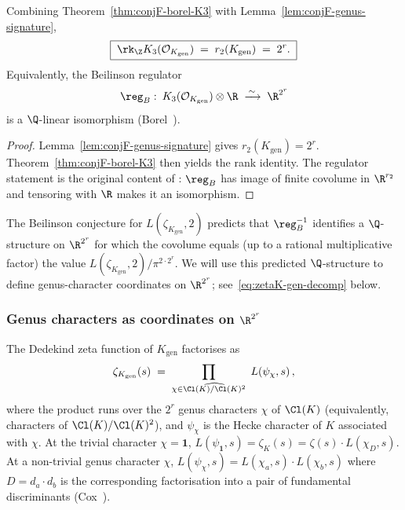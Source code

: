 \begin{corollary}\label{cor:conjF-borel-gen}
Combining Theorem~\ref{thm:conjF-borel-K3} with
Lemma~\ref{lem:conjF-genus-signature},
\[
   \boxed{\;\rk_\Z K_3(\mathcal{O}_{K_{\mathrm{gen}}}) \;=\;
   r_2(K_{\mathrm{gen}}) \;=\; 2^r.\;}
\]
Equivalently, the Beilinson regulator
\[
   \reg_B \,\colon\, K_3(\mathcal{O}_{K_{\mathrm{gen}}}) \otimes \R
   \;\xrightarrow{\,\sim\,}\; \R^{2^r}
\]
is a $\Q$-linear isomorphism (Borel~\cite[Thm.~12.1]{Borel1974}).
\end{corollary}

\begin{proof}
Lemma~\ref{lem:conjF-genus-signature} gives $r_2(K_{\mathrm{gen}}) =
2^r$.  Theorem~\ref{thm:conjF-borel-K3} then yields the rank identity.
The regulator statement is the original content of
\cite[Thm.~12.1]{Borel1974}: $\reg_B$ has image of finite covolume in
$\R^{r_2}$ and tensoring with $\R$ makes it an isomorphism.
\end{proof}

\begin{remark}\label{rk:conjF-K3-vs-reg}
The Beilinson conjecture for $L(\zeta_{K_{\mathrm{gen}}}, 2)$
\cite[Conj.~3.4]{Beilinson1985} predicts that
$\reg_B^{-1}$ identifies a $\Q$-structure on $\R^{2^r}$ for which the
covolume equals (up to a rational multiplicative factor) the value
$L(\zeta_{K_{\mathrm{gen}}}, 2)/\pi^{2 \cdot 2^r}$.  We will use this
predicted $\Q$-structure to define genus-character coordinates on
$\R^{2^r}$; see~\eqref{eq:zetaK-gen-decomp} below.
\end{remark}

\subsubsection{Genus characters as coordinates on $\R^{2^r}$}
\label{sec:conjF-borel-coords}

\begin{proposition}\label{prop:conjF-zeta-decomp}
The Dedekind zeta function of $K_{\mathrm{gen}}$ factorises as
\begin{equation}\label{eq:zetaK-gen-decomp}
   \zeta_{K_{\mathrm{gen}}}(s) \;=\;
   \prod_{\chi \in \widehat{\Cl(K)/\Cl(K)^2}}
   \;L\!\left(\psi_\chi, s\right),
\end{equation}
where the product runs over the $2^r$ genus characters $\chi$ of
$\Cl(K)$ \textup{(}equivalently, characters of
$\Cl(K)/\Cl(K)^2$\textup{)}, and $\psi_\chi$ is the Hecke character of
$K$ associated with $\chi$.  At the trivial character
$\chi = \mathbf{1}$, $L(\psi_{\mathbf{1}}, s) = \zeta_K(s) =
\zeta(s) \cdot L(\chi_D, s)$.  At a non-trivial genus character
$\chi$, $L(\psi_\chi, s) = L(\chi_a, s) \cdot L(\chi_b, s)$ where
$D = d_a \cdot d_b$ is the corresponding factorisation into a pair of
fundamental discriminants
\textup{(}Cox~\cite[Thm.~7.7]{Cox1989}\textup{)}.
\end{proposition}

